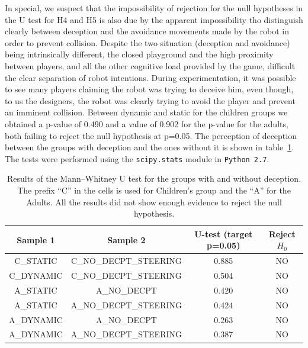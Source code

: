 In special, we suspect that the impossibility of rejection for the null hypotheses in the U test for H4 and H5 is also due by the apparent impossibility tho distinguish clearly between deception and the avoidance movements made by the robot in order to prevent collision. Despite the two situation (deception and avoidance) being intrinsically different, the closed playground and the high proximity between players, and all the other cognitive load provided by the game, difficult the clear separation of robot intentions. During experimentation, it was possible to see many players claiming the robot was trying to deceive him, even though, to us the designers, the robot was clearly trying to avoid the player and prevent an imminent collision. Between dynamic and static for the children groups we obtained a p-value of 0.490 and a value of 0.902 for the p-value for the adults, both failing to reject the null hypothesis at p=0.05. The perception of deception between the groups with deception and the ones without it is shown in table~\ref{tab:deception_U_test}. The tests were performed using the \verb|scipy.stats| module in \verb|Python 2.7|.

\begin{table}[htbp]
    \caption{Results of the Mann–Whitney U test for the groups with and without deception. The prefix ``C'' in the cells is used for Children's group and the ``A'' for the Adults. All the results did not show enough evidence to reject the null hypothesis.}
    \begin{center}
        \begin{tabular}{|c|c|c|c|}
            \hline
            \textbf{Sample 1} & \textbf{Sample 2} & \textbf{U-test (target p=0.05)} & \textbf{Reject $H_{0}$} \\
            \hline
                C\_STATIC & C\_NO\_DECPT\_STEERING & 0.885 & NO\\ %
            \hline
                C\_DYNAMIC & C\_NO\_DECPT\_STEERING & 0.504 & NO\\
            \hline
            \hline
                A\_STATIC & A\_NO\_DECPT &  0.420 & NO\\
            \hline
                A\_STATIC & A\_NO\_DECPT\_STEERING & 0.424 & NO\\
            \hline
                A\_DYNAMIC & A\_NO\_DECPT & 0.263 & NO\\
            \hline
                A\_DYNAMIC & A\_NO\_DECPT\_STEERING & 0.387  & NO\\
            \hline
        \end{tabular}
        \label{tab:deception_U_test}
    \end{center}
\end{table}

